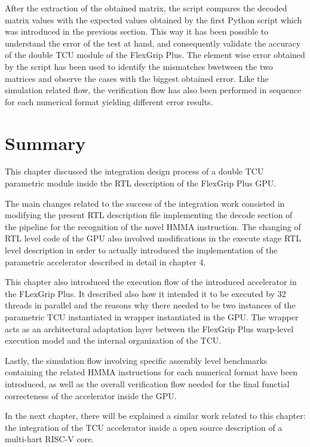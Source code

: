 After the extraction of the obtained matrix, the script compares the decoded matrix values with the expected values obtained by the first Python script which was introduced in the previous section. This way it has been possible to understand the error of the test at hand, and consequently validate the accuracy of the double TCU module of the FlexGrip Plus. The element wise error obtained by the script has been used to identify the mismatches bwetween the two matrices and observe the cases with the biggest obtained error. Like the simulation related flow, the verification flow has also been performed in sequence for each numerical format yielding different error results.


\newpage
\section{Summary}


This chapter discussed the integration design process of a double TCU parametric module inside the RTL description of the FlexGrip Plus GPU.


The main changes related to the success of the integration work consisted in modifying the present RTL description file implementing the decode section of the pipeline for the recognition of the novel HMMA instruction. The changing of RTL level code of the GPU also involved modifications in the execute stage RTL level description in order to actually introduced the implementation of the parametric accelerator described in detail in chapter 4.

This chapter also introduced the execution flow of the introduced accelerator in the FLexGrip Plus. It described also how it intended it to be executed by 32 threads in parallel and the reasons why there needed to be two instances of the parametric TCU instantiated in wrapper instantiated in the GPU. The wrapper acts as an architectural adaptation layer between the FlexGrip Plus warp-level execution model and the internal organization of the TCU.


Lastly, the simulation flow involving specific assembly level benchmarks containing the related HMMA instructions for each numerical format have been introduced, as well as the overall verification flow needed for the final functial correcteness of the accelerator inside the GPU. 


In the next chapter, there will be explained a similar work related to this chapter: the integration of the TCU accelerator inside a open source description of a multi-hart RISC-V core.